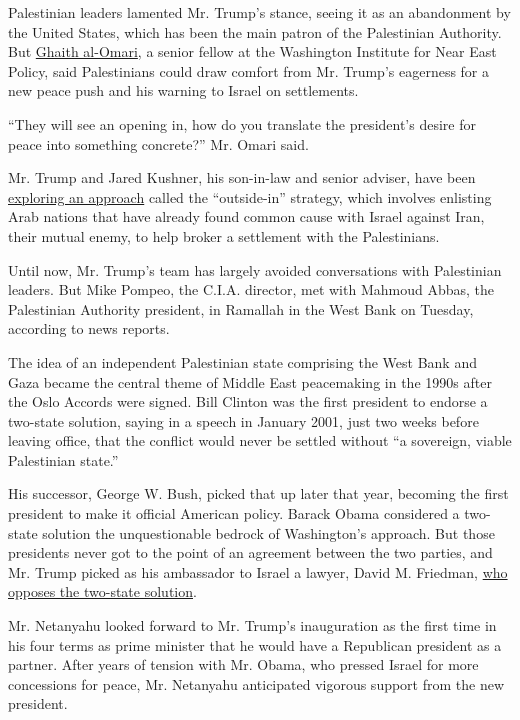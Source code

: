 Palestinian leaders lamented Mr. Trump's stance, seeing it as an
abandonment by the United States, which has been the main patron of the
Palestinian Authority. But
\href{http://www.washingtoninstitute.org/experts/view/ghaith-al-omari}{Ghaith
al-Omari}, a senior fellow at the Washington Institute for Near East
Policy, said Palestinians could draw comfort from Mr. Trump's eagerness
for a new peace push and his warning to Israel on settlements.

``They will see an opening in, how do you translate the president's
desire for peace into something concrete?'' Mr. Omari said.

Mr. Trump and Jared Kushner, his son-in-law and senior adviser, have
been
\href{https://www.nytimes.com/2017/02/09/world/middleeast/trump-arabs-palestinians-israel.html}{exploring
an approach} called the ``outside-in'' strategy, which involves
enlisting Arab nations that have already found common cause with Israel
against Iran, their mutual enemy, to help broker a settlement with the
Palestinians.

Until now, Mr. Trump's team has largely avoided conversations with
Palestinian leaders. But Mike Pompeo, the C.I.A. director, met with
Mahmoud Abbas, the Palestinian Authority president, in Ramallah in the
West Bank on Tuesday, according to news reports.

The idea of an independent Palestinian state comprising the West Bank
and Gaza became the central theme of Middle East peacemaking in the
1990s after the Oslo Accords were signed. Bill Clinton was the first
president to endorse a two-state solution, saying in a speech in January
2001, just two weeks before leaving office, that the conflict would
never be settled without ``a sovereign, viable Palestinian state.''

His successor, George W. Bush, picked that up later that year, becoming
the first president to make it official American policy. Barack Obama
considered a two-state solution the unquestionable bedrock of
Washington's approach. But those presidents never got to the point of an
agreement between the two parties, and Mr. Trump picked as his
ambassador to Israel a lawyer, David M. Friedman,
\href{https://www.nytimes.com/2016/12/16/world/middleeast/david-friedman-us-ambassador-israel.html}{who
opposes the two-state solution}.

Mr. Netanyahu looked forward to Mr. Trump's inauguration as the first
time in his four terms as prime minister that he would have a Republican
president as a partner. After years of tension with Mr. Obama, who
pressed Israel for more concessions for peace, Mr. Netanyahu anticipated
vigorous support from the new president.

